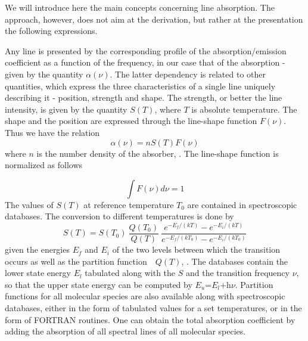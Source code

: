 
\label{sec:line_absorption}

 
We will introduce here the main concepts concerning
line absorption. The approach, however, does not aim  at the
derivation, but rather at the presentation the following expressions.

Any line is presented by the corresponding profile of the absorption/emission
coefficient as a function of the frequency, in our case that of the
absorption - given by the quantity $\alpha(\nu)$. The latter dependency
is related to other quantities, which express the three
characteristics of a single line uniquely describing it - position,
strength and shape. 
The strength, or better the line intensity, is given by the quantity
$S(T)$, where $T$ is absolute temperature. The shape and the position are expressed through the
line-shape function $F(\nu)$. Thus we have the relation    
\begin{equation}\label{abs_coeff}
  \alpha(\nu)=nS(T)F(\nu)
\end{equation} 
where $n$ is the number density of the absorber, \citet{goodyandyung:89}. The line-shape
function is normalized as follows

\begin{equation}\label{line_shape_norm}
  \int F(\nu)d\nu=1
\end{equation}
The values of $S(T)$ at reference temperature $T_0$ are contained in
spectroscopic databases. The conversion to different temperatures is
done by
\begin{equation}\label{line_intensity}
  S(T)=S(T_0)~\frac{Q(T_0)}{Q(T)}~\frac{e^{-E_f/(kT)}
    - e^{-E_i/(kT)}}{e^{-E_f/(kT_0)} - e^{-E_i/(kT_0)}}
\end{equation}
given the energies $E_f$ and $E_i$ of the two levels between which the
transition occurs as well as the partition function~~$Q(T)$, \citet{rothman:98}. The
databases contain the lower state energy $E_l$ tabulated along with
the $S$ and the transition frequency $\nu$, so that the upper state
energy can be computed by $E_u$=$E_l$+h$\nu$. Partition functions for
all molecular species are also available along with spectroscopic
databases, either in the form of tabulated values for a set
temperatures, or in the form of FORTRAN routines. One can obtain the
total absorption coefficient by adding the absorption of all spectral
lines of all molecular species.


